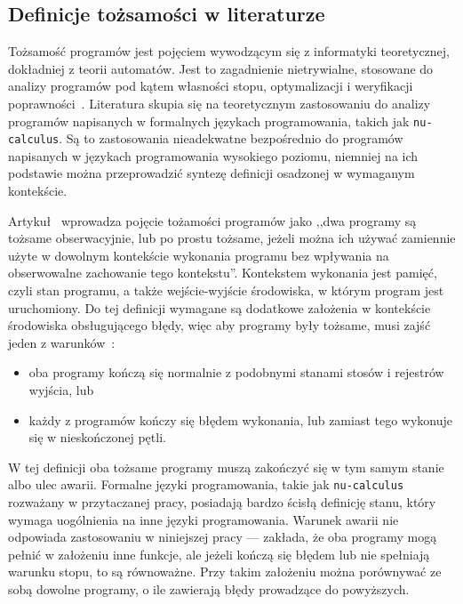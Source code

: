 \subsection{Definicje tożsamości w literaturze}

Tożsamość programów jest pojęciem wywodzącym się z informatyki teoretycznej, dokładniej z teorii automatów.
Jest to zagadnienie nietrywialne, stosowane do analizy programów pod kątem własności stopu, optymalizacji i
weryfikacji poprawności~\cite{tzevelekos2012program}.
Literatura skupia się na teoretycznym zastosowaniu do analizy programów napisanych w formalnych językach
programowania, takich jak \texttt{nu-calculus}.
Są to zastosowania nieadekwatne bezpośrednio do programów napisanych w językach programowania wysokiego poziomu,
niemniej na ich podstawie można przeprowadzić syntezę definicji osadzonej w wymaganym kontekście.

Artykuł~\cite{tzevelekos2012program} wprowadza pojęcie tożamości programów jako ,,dwa programy są
tożsame obserwacyjnie, lub po prostu tożsame, jeżeli można ich używać zamiennie użyte w dowolnym kontekście wykonania
programu bez wpływania na obserwowalne zachowanie tego kontekstu''.
Kontekstem wykonania jest pamięć, czyli stan programu, a także wejście-wyjście środowiska, w którym program jest
uruchomiony.
Do tej definicji wymagane są dodatkowe założenia w kontekście środowiska obsługującego błędy, więc aby programy były
tożsame, musi zajść jeden z warunków~\cite{churchill2019semantic}:
\begin{itemize}
    \item oba programy kończą się normalnie z podobnymi stanami stosów i rejestrów wyjścia, lub
    \item każdy z programów kończy się błędem wykonania, lub zamiast tego wykonuje się w nieskończonej pętli.
\end{itemize}

W tej definicji oba tożsame programy muszą zakończyć się w tym samym stanie albo ulec awarii.
Formalne języki programowania, takie jak \texttt{nu-calculus} rozważany w przytaczanej pracy, posiadają bardzo
ścisłą definicję stanu, który wymaga uogólnienia na inne języki programowania.
Warunek awarii nie odpowiada zastosowaniu w niniejszej pracy --- zakłada, że oba programy mogą pełnić w założeniu
inne funkcje, ale jeżeli kończą się błędem lub nie spełniają warunku stopu, to są równoważne.
Przy takim założeniu można porównywać ze sobą dowolne programy, o ile zawierają błędy prowadzące do powyższych.

